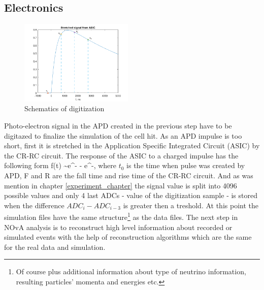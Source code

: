 \subsection{Electronics}
\begin{figure}
\vspace{-20pt}
  \begin{center}
    \includegraphics[width=0.48\textwidth]{figures/digit_scheme.png}
  \end{center}
\vspace{1mm}
\caption{Schematics of digitization}
\end{figure}
Photo-electron signal in the APD created in the previous step have to be digitazed to finalize the simulation
of the cell hit. As an APD impulse is too short, first it is stretched in the Application Specific Integrated 
Circuit (ASIC) by the CR-RC circuit. The response of the ASIC to a charged impulse has the following form
\be
f(t) \sim e^{-} - e^{-},
\ee
where $t_0$ is the time when pulse was created by APD, F and R are the fall time and rise time of the CR-RC 
circuit. And as was mention in chapter \ref{experiment_chapter} the signal value is split into 4096 possible
values and only 4 last ADCs - value of the digitization sample - is stored when the difference $ADC_i - ADC_{i-3}$
is greater then a treshold. 
At this point the simulation files have the same structure\footnote{Of course plus additional information about type 
of neutrino information, resulting particles' momenta and energies etc.} as the data files.
The next step in NOvA analysis is to reconstruct high level information about recorded or simulated events
with the help of reconstruction algorithms which are the same for the real data and simulation.

